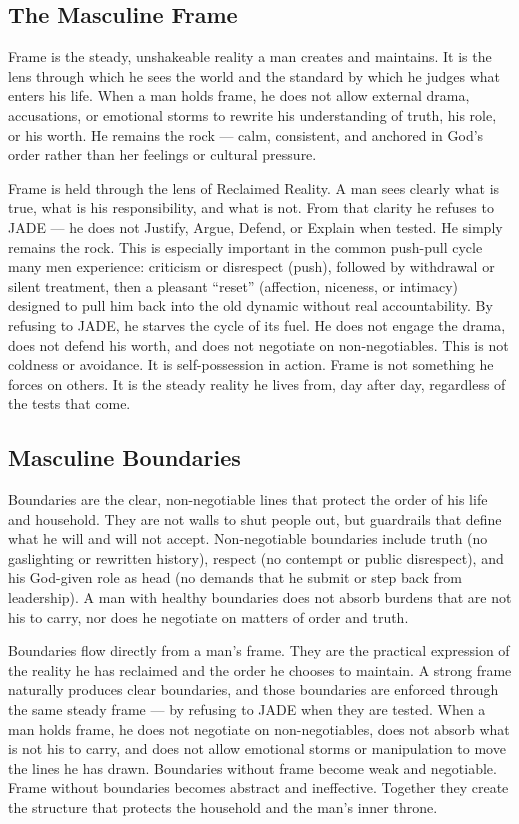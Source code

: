 \documentclass[12pt,a4paper]{book}
\begin{document}
\subsection{The Masculine Frame}
Frame is the steady, unshakeable reality a man creates and maintains. It is the lens through which he sees the world and the standard by which he judges what enters his life. When a man holds frame, he does not allow external drama, accusations, or emotional storms to rewrite his understanding of truth, his role, or his worth. He remains the rock — calm, consistent, and anchored in God’s order rather than her feelings or cultural pressure.

Frame is held through the lens of Reclaimed Reality. A man sees clearly what is true, what is his responsibility, and what is not. From that clarity he refuses to JADE — he does not Justify, Argue, Defend, or Explain when tested. He simply remains the rock. This is especially important in the common push-pull cycle many men experience: criticism or disrespect (push), followed by withdrawal or silent treatment, then a pleasant “reset” (affection, niceness, or intimacy) designed to pull him back into the old dynamic without real accountability. By refusing to JADE, he starves the cycle of its fuel. He does not engage the drama, does not defend his worth, and does not negotiate on non-negotiables. This is not coldness or avoidance. It is self-possession in action. Frame is not something he forces on others. It is the steady reality he lives from, day after day, regardless of the tests that come.

\subsection{Masculine Boundaries}
Boundaries are the clear, non-negotiable lines that protect the order of his life and household. They are not walls to shut people out, but guardrails that define what he will and will not accept. Non-negotiable boundaries include truth (no gaslighting or rewritten history), respect (no contempt or public disrespect), and his God-given role as head (no demands that he submit or step back from leadership). A man with healthy boundaries does not absorb burdens that are not his to carry, nor does he negotiate on matters of order and truth.

Boundaries flow directly from a man’s frame. They are the practical expression of the reality he has reclaimed and the order he chooses to maintain. A strong frame naturally produces clear boundaries, and those boundaries are enforced through the same steady frame — by refusing to JADE when they are tested. When a man holds frame, he does not negotiate on non-negotiables, does not absorb what is not his to carry, and does not allow emotional storms or manipulation to move the lines he has drawn. Boundaries without frame become weak and negotiable. Frame without boundaries becomes abstract and ineffective. Together they create the structure that protects the household and the man’s inner throne.
\end{document}
